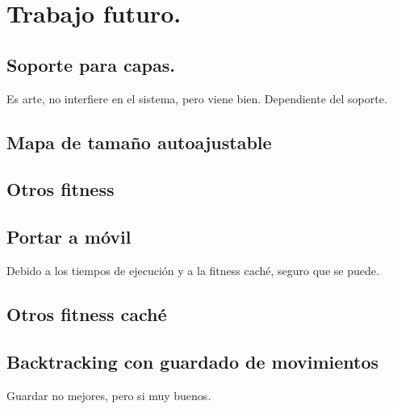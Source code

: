 \chapter{Trabajo futuro.}\label{cap:capitulo8}


\section{Soporte para capas.}

Es arte, no interfiere en el sistema, pero viene bien. Dependiente del soporte.


\section{Mapa de tamaño autoajustable}


\section{Otros fitness}


\section{Portar a móvil}

Debido a los tiempos de ejecución y a la fitness caché, seguro que se puede.

\section{Otros fitness caché}


\section{Backtracking con guardado de movimientos}

Guardar no mejores, pero si muy buenos.
